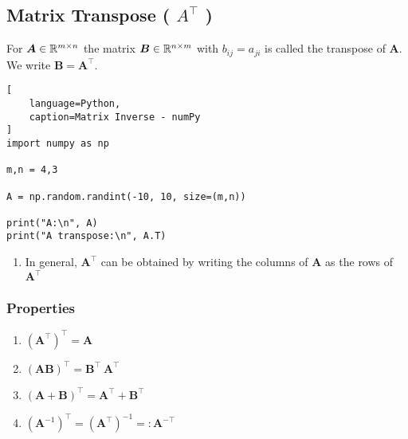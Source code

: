 \subsection{Matrix Transpose ( $A^{\top}$ ) \cite{mfml/book/mml/Deisenroth-Faisal-Ong}}

For $\bm{A} \in \mathbb{R}^{m\times n}$ the matrix $\bm{B} \in \mathbb{R}^{n\times m}$ with $b_{ij} = a_{ji}$ is called the transpose of $\bm{A}$.
We write $\bm{B} = \bm{A}^\top$.
\hfill \cite{mfml/book/mml/Deisenroth-Faisal-Ong}






\begin{lstlisting}[
    language=Python,
    caption=Matrix Inverse - numPy
]
import numpy as np

m,n = 4,3

A = np.random.randint(-10, 10, size=(m,n))

print("A:\n", A)
print("A transpose:\n", A.T)
\end{lstlisting}







\begin{enumerate}
    \item In general, $\bm{A}^\top$ can be obtained by writing the columns of $\bm{A}$ as the rows of $\bm{A}^\top$
    \hfill \cite{mfml/book/mml/Deisenroth-Faisal-Ong}
\end{enumerate}



\subsubsection{Properties}

\begin{multicols}{2}
\begin{enumerate}
    \item $(\bm{A}^\top)^\top = \bm{A}$
    \hfill \cite{mfml/book/mml/Deisenroth-Faisal-Ong}

    \item $(\bm{AB})^\top = \bm{B}^\top\ \bm{A}^\top$
    \hfill \cite{mfml/book/mml/Deisenroth-Faisal-Ong}

    \item $(\bm{A}+\bm{B})^\top = \bm{A}^\top + \bm{B}^\top$
    \hfill \cite{mfml/book/mml/Deisenroth-Faisal-Ong}

    \item $(\bm{A}^{-1})^\top = (\bm{A}^\top)^{-1} =: \bm{A}^{-\top}$
    \hfill \cite{mfml/book/mml/Deisenroth-Faisal-Ong}

\end{enumerate}
\end{multicols}







